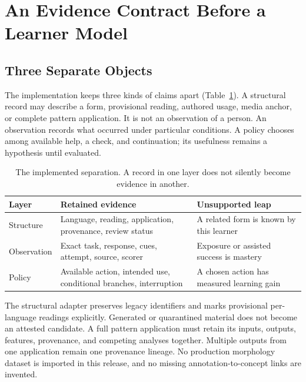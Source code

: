 \documentclass{article}
\begin{document}
\section{An Evidence Contract Before a Learner Model}
\label{sec:contract}

\subsection{Three Separate Objects}

The implementation keeps three kinds of claims apart (Table~\ref{tab:layers}). A structural record may describe a form, provisional reading, authored usage, media anchor, or complete pattern application. It is not an observation of a person. An observation records what occurred under particular conditions. A policy chooses among available help, a check, and continuation; its usefulness remains a hypothesis until evaluated.

\begin{table}[t]
\caption{The implemented separation. A record in one layer does not silently become evidence in another.}
\label{tab:layers}
\centering
\begin{tabular}{@{}>{\raggedright\arraybackslash}p{}>{\raggedright\arraybackslash}p{}>{\raggedright\arraybackslash}p{}@{}}
\toprule
Layer & Retained evidence & Unsupported leap \\
\midrule
Structure & Language, reading, application, provenance, review status & A related form is known by this learner \\
Observation & Exact task, response, cues, attempt, source, scorer & Exposure or assisted success is mastery \\
Policy & Available action, intended use, conditional branches, interruption & A chosen action has measured learning gain \\
\bottomrule
\end{tabular}
\end{table}

The structural adapter preserves legacy identifiers and marks provisional per-language readings explicitly. Generated or quarantined material does not become an attested candidate. A full pattern application must retain its inputs, outputs, features, provenance, and competing analyses together. Multiple outputs from one application remain one provenance lineage. No production morphology dataset is imported in this release, and no missing annotation-to-concept links are invented.
\end{document}
